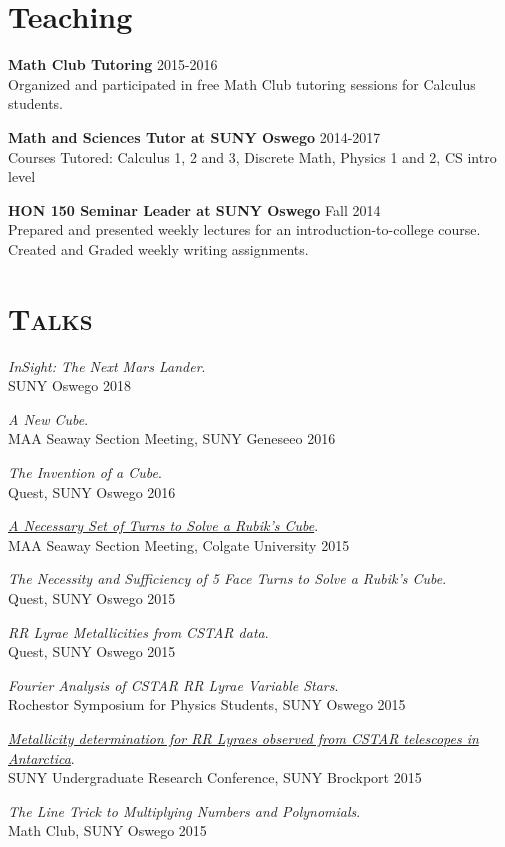 \documentclass[8pt]{article}
\renewenvironment{itemize}{
  \begin{list}{}{
    \setlength{\leftmargin}{1.5em}
  }
}{
  \end{list}
}
\begin{document}
\section*{Teaching}
\begin{itemize}
\item \textbf{Math Club Tutoring} \hfill 2015-2016\\
Organized and participated in free Math Club tutoring sessions for Calculus students.
\item \textbf{Math and Sciences Tutor at SUNY Oswego} \hfill 2014-2017\\
Courses Tutored: Calculus 1, 2 and 3, Discrete Math, Physics 1 and 2, CS intro level
\item \textbf{HON 150 Seminar Leader at SUNY Oswego} \hfill Fall 2014\\
Prepared and presented weekly lectures for an introduction-to-college course. Created and Graded weekly writing assignments.
\end{itemize}

\section*{\textsc{Talks}}

\begin{itemize}
\item \emph{InSight: The Next Mars Lander}. \\
SUNY Oswego \hfill 2018
\item \emph{A New Cube}. \\
  MAA Seaway Section Meeting, SUNY Geneseeo \hfill 2016
\item \emph{The Invention of a Cube}.\\
  Quest, SUNY Oswego \hfill 2016
\item \href{http://kroffo.github.io/presentations/SeawaySpr15.pdf}{\emph{A Necessary Set of Turns to Solve a Rubik's Cube}}.\\
  MAA Seaway Section Meeting, Colgate University \hfill 2015
\item \emph{The Necessity and Sufficiency of 5 Face Turns to Solve a Rubik's Cube}.\\
  Quest, SUNY Oswego \hfill 2015
\item \emph{RR Lyrae Metallicities from CSTAR data}.\\
  Quest, SUNY Oswego \hfill 2015
\item \emph{Fourier Analysis of CSTAR RR Lyrae Variable Stars}.\\
  Rochestor Symposium for Physics Students, SUNY Oswego \hfill 2015
\item \href{http://kroffo.github.io/presentations/RRLyraeMetallicity2015.pdf}{\emph{Metallicity determination for RR Lyraes observed from CSTAR telescopes in Antarctica}}.\\
  SUNY Undergraduate Research Conference, SUNY Brockport \hfill 2015
\item \emph{The Line Trick to Multiplying Numbers and Polynomials}.\\
  Math Club, SUNY Oswego \hfill 2015

\end{itemize}
\end{document}

